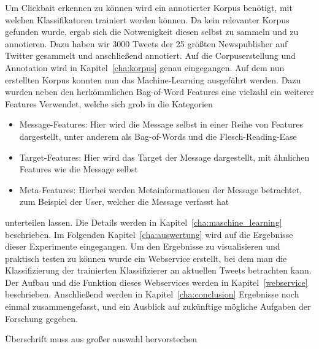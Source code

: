 Um Clickbait erkennen zu können wird ein annotierter Korpus benötigt, mit welchen Klassifikatoren trainiert werden können. Da kein relevanter Korpus gefunden wurde, ergab sich die Notwenigkeit diesen selbst zu sammeln und zu annotieren.
Dazu haben wir 3000 Tweets der 25 größten  Newspublisher  auf Twitter gesammelt und anschließend annotiert. Auf die Corpuserstellung und Annotation wird in Kapitel~\ref{cha:korpus} genau eingegangen.
Auf dem nun erstellten Korpus konnten nun das Machine-Learning ausgeführt werden. Dazu wurden neben den herkömmlichen Bag-of-Word Features eine vielzahl ein weiterer Features Verwendet, welche sich grob in die Kategorien
\begin{itemize}
  \item Message-Features: Hier wird die Message selbst in einer Reihe von Features dargestellt, unter anderem als Bag-of-Words und die Flesch-Reading-Ease
  \item Target-Features: Hier wird das Target der Message dargestellt, mit ähnlichen Features wie die Message selbst
  \item Meta-Features: Hierbei werden Metainformationen der Message betrachtet, zum Beispiel der User, welcher die Message verfasst hat
\end{itemize}
unterteilen lassen. Die Details werden in Kapitel~\ref{cha:maschine_learning} beschrieben.
Im Folgenden Kapitel~\ref{cha:auswertung} wird auf die Ergebnisse dieser Experimente eingegangen.
Um den Ergebnisse zu visualisieren und praktisch testen zu können wurde ein Webservice erstellt, bei dem man die Klassifizierung der trainierten Klassifizierer an aktuellen Tweets betrachten kann. Der Aufbau und die Funktion dieses Webservices werden in Kapitel~\ref{webservice} beschrieben.
Anschließend werden in Kapitel~\ref{cha:conclusion} Ergebnisse noch einmal zusammengefasst, und ein Ausblick auf zukünftige mögliche Aufgaben der Forschung gegeben.



Überschrift muss aus großer auswahl hervorstechen